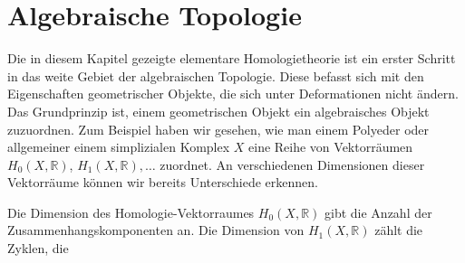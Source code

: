 %
%
%
\section{Algebraische Topologie}
Die in diesem Kapitel gezeigte elementare Homologietheorie ist ein
erster Schritt in das weite Gebiet der algebraischen Topologie.
Diese befasst sich mit den Eigenschaften geometrischer Objekte, die
sich unter Deformationen nicht ändern.
Das Grundprinzip ist, einem geometrischen Objekt ein algebraisches Objekt
zuzuordnen.
Zum Beispiel haben wir gesehen, wie man einem Polyeder oder allgemeiner
einem simplizialen Komplex $X$ eine Reihe von Vektorräumen $H_0(X,\mathbb R)$,
$H_1(X,\mathbb R),\dots$ zuordnet.
An verschiedenen Dimensionen dieser Vektorräume können wir bereits 
Unterschiede erkennen.

Die Dimension des Homologie-Vektorraumes $H_0(X,\mathbb R)$ gibt die Anzahl
der Zusammenhangskomponenten an.
Die Dimension von $H_1(X,\mathbb R)$ zählt die Zyklen, die 




